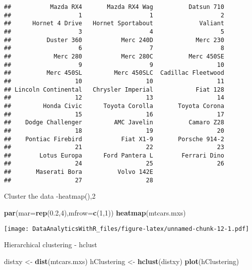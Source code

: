 \documentclass[]{book}
\newenvironment{Shaded}{\begin{snugshade}}{\end{snugshade}}
\newcommand{\KeywordTok}[1]{\textcolor[rgb]{0.13,0.29,0.53}{\textbf{{#1}}}}
\newcommand{\DataTypeTok}[1]{\textcolor[rgb]{0.13,0.29,0.53}{{#1}}}
\newcommand{\DecValTok}[1]{\textcolor[rgb]{0.00,0.00,0.81}{{#1}}}
\newcommand{\FloatTok}[1]{\textcolor[rgb]{0.00,0.00,0.81}{{#1}}}
\newcommand{\StringTok}[1]{\textcolor[rgb]{0.31,0.60,0.02}{{#1}}}
\newcommand{\NormalTok}[1]{{#1}}
\begin{document}
\begin{verbatim}
##           Mazda RX4       Mazda RX4 Wag          Datsun 710 
##                   1                   1                   2 
##      Hornet 4 Drive   Hornet Sportabout             Valiant 
##                   3                   4                   5 
##          Duster 360           Merc 240D            Merc 230 
##                   6                   7                   8 
##            Merc 280           Merc 280C          Merc 450SE 
##                   9                   9                  10 
##          Merc 450SL         Merc 450SLC  Cadillac Fleetwood 
##                  10                  10                  11 
## Lincoln Continental   Chrysler Imperial            Fiat 128 
##                  12                  13                  14 
##         Honda Civic      Toyota Corolla       Toyota Corona 
##                  15                  16                  17 
##    Dodge Challenger         AMC Javelin          Camaro Z28 
##                  18                  19                  20 
##    Pontiac Firebird           Fiat X1-9       Porsche 914-2 
##                  21                  22                  23 
##        Lotus Europa      Ford Pantera L        Ferrari Dino 
##                  24                  25                  26 
##       Maserati Bora          Volvo 142E 
##                  27                  28
\end{verbatim}

Cluster the data -heatmap(),2

\begin{Shaded}
\begin{Highlighting}[]
\KeywordTok{par}\NormalTok{(}\DataTypeTok{mar=}\KeywordTok{rep}\NormalTok{(}\FloatTok{0.2}\NormalTok{,}\DecValTok{4}\NormalTok{),}\DataTypeTok{mfrow=}\KeywordTok{c}\NormalTok{(}\DecValTok{1}\NormalTok{,}\DecValTok{1}\NormalTok{))}
\KeywordTok{heatmap}\NormalTok{(mtcars.mxs)}
\end{Highlighting}
\end{Shaded}

\texttt{[image: DataAnalyticsWithR\_files/figure-latex/unnamed-chunk-12-1.pdf]}

Hierarchical clustering - hclust

\begin{Shaded}
\begin{Highlighting}[]
\NormalTok{distxy <-}\StringTok{ }\KeywordTok{dist}\NormalTok{(mtcars.mxs)}
\NormalTok{hClustering <-}\StringTok{ }\KeywordTok{hclust}\NormalTok{(distxy)}
\KeywordTok{plot}\NormalTok{(hClustering)}
\end{Highlighting}
\end{Shaded}
\end{document}

